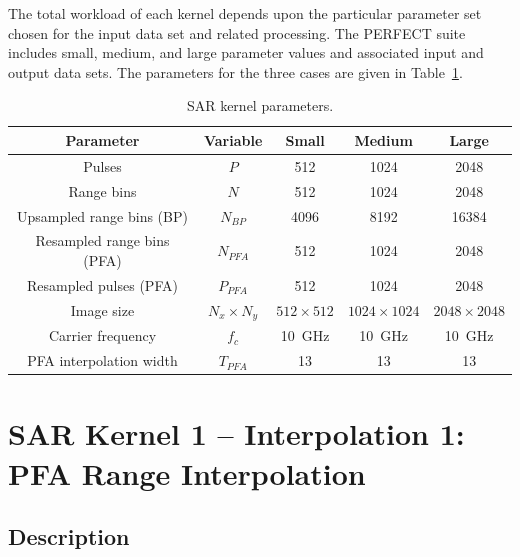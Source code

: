 \documentclass{report}
\begin{document}
The total workload of each kernel depends upon the particular parameter
set chosen for the input data set and related processing.
The PERFECT suite includes small, medium, and large parameter values and
associated input and output data sets.
The parameters for the three cases are given in Table~\ref{tbl:sar:params}.

\begin{table}[t]
    \begin{center}
    \caption{SAR kernel parameters.}
    \begin{tabular}{|c|c|c|c|c|}
        \hline
        Parameter & Variable & Small & Medium & Large \\ \hline
        Pulses & $P$ & 512 & 1024 & 2048 \\ \hline
        Range bins & $N$ & 512 & 1024 & 2048 \\ \hline
        Upsampled range bins (BP) & $N_{BP}$ & 4096 & 8192 & 16384 \\ \hline
        Resampled range bins (PFA) & $N_{PFA}$ & 512 & 1024 & 2048 \\ \hline
        Resampled pulses (PFA) & $P_{PFA}$ & 512 & 1024 & 2048 \\ \hline
        Image size & $N_x \times N_y$ & $512 \times 512$ & $1024 \times 1024$ & $2048 \times 2048$ \\ \hline
        Carrier frequency & $f_c$ & 10~GHz & 10~GHz & 10~GHz \\ \hline
        PFA interpolation width & $T_{PFA}$ & 13 & 13 & 13 \\ \hline
    \end{tabular}
    \label{tbl:sar:params}
    \end{center}
\end{table}



\section{SAR Kernel 1 -- Interpolation 1: \\ PFA Range Interpolation}

\subsection{Description}
\end{document}
